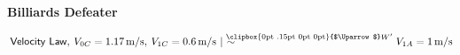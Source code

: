 \documentclass{article}                     %
\makeatletter
\theoremstyle{definition}
\newcommand{\Uuparrow}{%
	\raisebox{.2ex}{\clipbox{0pt .15pt 0pt 0pt}{$\Uparrow$}}
}
\newcommand{\nms}{%
	\mathbin{\mathpalette\@nms\expandafter}
}
\newcommand{\@nms}{\mid\joinrel\mkern-.5mu\sim}
\newcommand{\mrc}[1]{\mathbin{
		\mathchoice
		{\normalsize\hspace{.5mm}\nms^{\mkern-19mu\scriptsize\Uuparrow#1}\hspace{-.5mm}}
		{\normalsize\hspace{.5mm}\nms^{\mkern-19mu\scriptsize\Uuparrow#1}\hspace{-.5mm}}
		{\footnotesize\hspace{.5mm}\nms^{\mkern-13.5mu\fontsize{5.5}{0}\Uuparrow#1}}
		{\scriptsize\nms^{\mkern-10mu\tiny\Uuparrow#1}}
	}
}
\makeatother
\begin{document}
\noindent \label{eq:MRC_defeater}\textbf{Billiards Defeater}\hspace{6mm}\begin{minipage}[t]{.8\textwidth}
	$\hspace{.5ex} \mathsf{Velocity\ Law},\hspace{.5ex} V_{0C} = 1.17 \,\text{m/s},\hspace{.5ex} V_{1C} = 0.6\,\text{m/s} \mrc{W'}\, V_{1A} = 1\,\text{m/s}$
\end{minipage}\\ 










\printbibliography
\end{document}
